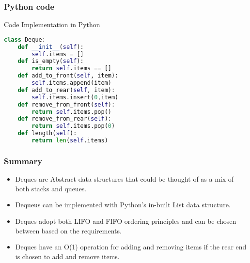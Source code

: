 \documentclass{beamer}
\begin{document}
\begin{frame}[fragile]
\frametitle{Python code}

Code Implementation in Python
\begin{lstlisting}[language=Python]
class Deque:
	def __init__(self):
		self.items = []
	def is_empty(self):
		return self.items == []
	def add_to_front(self, item):
		self.items.append(item)
	def add_to_rear(self, item):
		self.items.insert(0,item)
	def remove_from_front(self):
		return self.items.pop()
	def remove_from_rear(self):
		return self.items.pop(0)
	def length(self):
		return len(self.items)
\end{lstlisting}

\end{frame}

\begin{frame}
\frametitle{Summary}
\begin{itemize}
\item Deques are Abstract data structures that could be thought of as a mix of both stacks and queues.
\item Dequeus can be implemented with Python's in-built List data structure.
\item Deques adopt both LIFO and FIFO ordering principles and can be chosen between based on the requirements.
\item Deques have an O(1) operation for adding and removing items if the rear end is chosen to add and remove items.
\end{itemize}
\end{frame}
\end{document}
